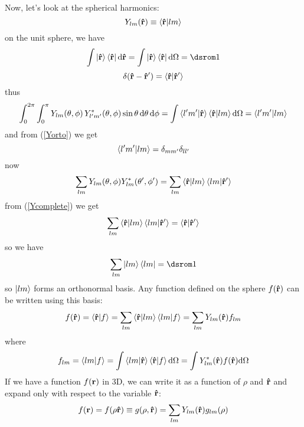 Now, let's look at the spherical harmonics: 
\begin{equation*}
  Y_{lm}({\bf\hat r})\equiv\mathinner{\langle{{\bf\hat r}|lm}\rangle}
\end{equation*}
on the unit sphere, we have 
\begin{equation*}
  \int\ket{\bf\hat r}\bra{\bf\hat r}\d{\bf\hat r}= \int\ket{\bf\hat r}\bra{\bf\hat r}\d\Omega=\one
\end{equation*}
\begin{equation*}
  \delta({\bf\hat r}-{\bf\hat r'})=\mathinner{\langle{{\bf\hat r}|{\bf\hat r'}}\rangle}
\end{equation*}
thus 
\begin{equation*}
  \int_0^{2\pi}\int_0^{\pi} Y_{lm}(\theta,\phi)\,Y^*_{l'm'}(\theta,\phi)\sin\theta\,{\rm d}\theta\,{\rm d}\phi = \int\mathinner{\langle{l'm'|{\bf\hat r}}\rangle}\mathinner{\langle{{\bf\hat r}|lm}\rangle}{\rm d}\Omega= \mathinner{\langle{l'm'|lm}\rangle}
\end{equation*}
and from (\ref{Yorto}) we get 
\begin{equation*}
  \mathinner{\langle{l'm'|lm}\rangle}=\delta_{mm'}\delta_{ll'}
\end{equation*}
now 
\begin{equation*}
  \sum_{lm}Y_{lm}(\theta,\phi)Y_{lm}^*(\theta',\phi')= \sum_{lm}\mathinner{\langle{{\bf\hat r}|lm}\rangle}\mathinner{\langle{lm|{\bf\hat r'}}\rangle}
\end{equation*}
from (\ref{Ycomplete}) we get 
\begin{equation*}
  \sum_{lm}\mathinner{\langle{{\bf\hat r}|lm}\rangle}\mathinner{\langle{lm|{\bf\hat r'}}\rangle}= \mathinner{\langle{{\bf\hat r}|{\bf\hat r'}}\rangle}
\end{equation*}
so we have 
\begin{equation*}
  \sum_{lm}\ket{lm}\bra{lm}=\one
\end{equation*}
so $\mathinner{|{lm}\rangle}$ forms an orthonormal basis. Any function defined on the sphere $f({\bf\hat r})$ can be written using this basis: 
\begin{equation*}
  f({\bf\hat r}) =\mathinner{\langle{{\bf\hat r}|f}\rangle} =\sum_{lm}\mathinner{\langle{{\bf\hat r}|lm}\rangle}\mathinner{\langle{lm|f}\rangle} =\sum_{lm}Y_{lm}({\bf\hat r})f_{lm}
\end{equation*}
where 
\begin{equation*}
  f_{lm}=\mathinner{\langle{lm|f}\rangle}=\int\mathinner{\langle{lm|{\bf\hat r}}\rangle}\mathinner{\langle{{\bf\hat r}|f}\rangle}{\rm d}\Omega =\int Y_{lm}^*({\bf\hat r}) f({\bf\hat r}){\rm d}\Omega
\end{equation*}
If we have a function $f({\bf r})$ in 3D, we can write it as a function of $\rho$ and ${\bf\hat r}$ and expand only with respect to the variable ${\bf\hat r}$: 
\begin{equation*}
  f({\bf r})=f(\rho{\bf\hat r})\equiv g(\rho,{\bf\hat r})= \sum_{lm}Y_{lm}({\bf\hat r})g_{lm}(\rho)
\end{equation*}
